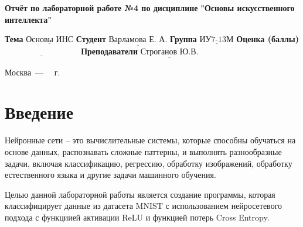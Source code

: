 \documentclass[12pt]{report}
\begin{document}
\begin{titlepage}
	
	\begin{center}
		\noindent\begin{minipage}{1.3\textwidth}\centering
			\Large\textbf{  Отчёт по лабораторной работе №4 по дисциплине}\newline
			\textbf{ "Основы искусственного интеллекта"}\newline\newline
		\end{minipage}
	\end{center}
	
	\noindent\textbf{Тема} $\underline{\text{Основы ИНС}}$\newline\newline
	\noindent\textbf{Студент} $\underline{\text{Варламова Е. А.}}$\newline\newline
	\noindent\textbf{Группа} $\underline{\text{ИУ7-13М}}$\newline\newline
	\noindent\textbf{Оценка (баллы)} $\underline{\text{~~~~~~~~~~~~~~~~~~~~~~~~~~~}}$\newline\newline
	\noindent\textbf{Преподаватели} $\underline{\text{Строганов Ю.В.}}$\newline\newline\newline
	
	\begin{center}
		\vfill
		Москва~---~\the\year
		~г.
	\end{center}
\end{titlepage}
\large
\setcounter{page}{2}
\def\contentsname{СОДЕРЖАНИЕ}
\renewcommand{\contentsname}{СОДЕРЖАНИЕ}
\tableofcontents
\renewcommand\labelitemi{---}
\newpage
\chapter*{Введение}

Нейронные сети -- это вычислительные системы, которые способны обучаться на основе данных, распознавать сложные паттерны, и выполнять разнообразные задачи, включая классификацию, регрессию, обработку изображений, обработку естественного языка и другие задачи машинного обучения.

Целью данной лабораторной работы является создание программы, которая классифицирует данные из датасета MNIST \cite{bib:mnist} с использованием нейросетевого подхода с функциией активации ReLU и функцией потерь Cross Entropy.
\end{document}
